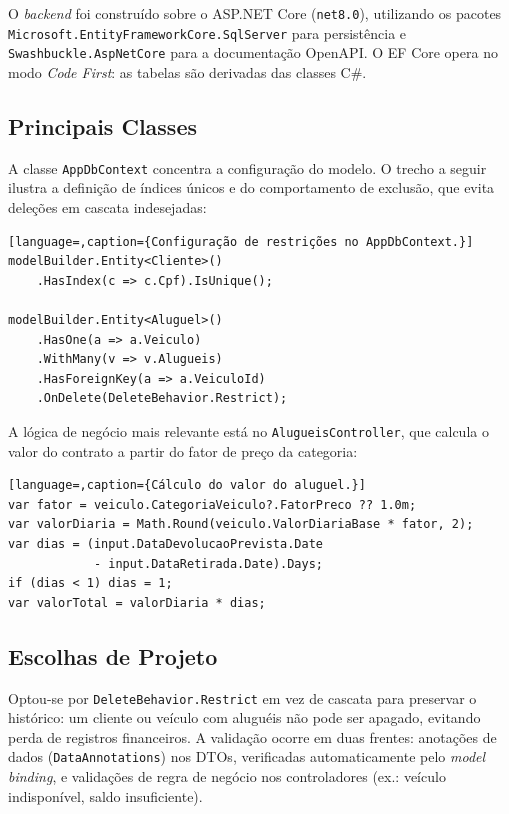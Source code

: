 \documentclass[12pt]{article}
\begin{document}
O \emph{backend} foi construído sobre o ASP.NET Core (\texttt{net8.0}), utilizando os pacotes \texttt{Microsoft.EntityFrameworkCore.SqlServer} para persistência e \texttt{Swashbuckle.AspNetCore} para a documentação OpenAPI. O EF Core opera no modo \emph{Code First}: as tabelas são derivadas das classes C\#.

\subsection{Principais Classes}

A classe \texttt{AppDbContext} concentra a configuração do modelo. O trecho a seguir ilustra a definição de índices únicos e do comportamento de exclusão, que evita deleções em cascata indesejadas:

\begin{lstlisting}[language=,caption={Configuração de restrições no AppDbContext.}]
modelBuilder.Entity<Cliente>()
    .HasIndex(c => c.Cpf).IsUnique();

modelBuilder.Entity<Aluguel>()
    .HasOne(a => a.Veiculo)
    .WithMany(v => v.Alugueis)
    .HasForeignKey(a => a.VeiculoId)
    .OnDelete(DeleteBehavior.Restrict);
\end{lstlisting}

A lógica de negócio mais relevante está no \texttt{AlugueisController}, que calcula o valor do contrato a partir do fator de preço da categoria:

\begin{lstlisting}[language=,caption={Cálculo do valor do aluguel.}]
var fator = veiculo.CategoriaVeiculo?.FatorPreco ?? 1.0m;
var valorDiaria = Math.Round(veiculo.ValorDiariaBase * fator, 2);
var dias = (input.DataDevolucaoPrevista.Date
            - input.DataRetirada.Date).Days;
if (dias < 1) dias = 1;
var valorTotal = valorDiaria * dias;
\end{lstlisting}

\subsection{Escolhas de Projeto}

Optou-se por \texttt{DeleteBehavior.Restrict} em vez de cascata para preservar o histórico: um cliente ou veículo com aluguéis não pode ser apagado, evitando perda de registros financeiros. A validação ocorre em duas frentes: anotações de dados (\texttt{DataAnnotations}) nos DTOs, verificadas automaticamente pelo \emph{model binding}, e validações de regra de negócio nos controladores (ex.: veículo indisponível, saldo insuficiente).
\end{document}
